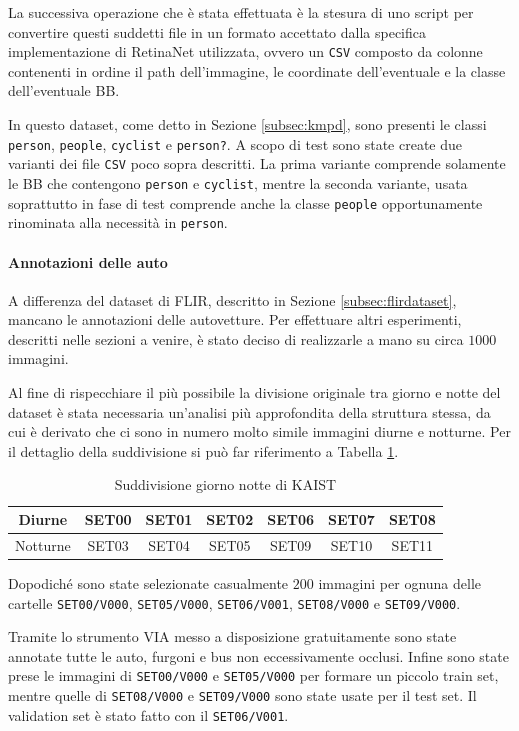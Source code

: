 La successiva operazione che è stata effettuata è la stesura di uno script per convertire questi suddetti file in un formato accettato dalla specifica implementazione di RetinaNet utilizzata, ovvero un \texttt{CSV} composto da colonne contenenti in ordine il path dell'immagine, le coordinate dell'eventuale e la classe dell'eventuale \ac{BB}. 

In questo dataset, come detto in Sezione \ref{subsec:kmpd}, sono presenti le classi \texttt{person}, \texttt{people}, \texttt{cyclist} e \texttt{person?}. A scopo di test sono state create due varianti dei file \texttt{CSV} poco sopra descritti. La prima variante comprende solamente le \ac{BB} che contengono \texttt{person} e \texttt{cyclist}, mentre la seconda variante, usata soprattutto in fase di test comprende anche la classe \texttt{people} opportunamente rinominata alla necessità in \texttt{person}.
\paragraph{Annotazioni delle auto}
A differenza del dataset di FLIR, descritto in Sezione \ref{subsec:flirdataset}, mancano le annotazioni delle autovetture. Per effettuare altri esperimenti, descritti nelle sezioni a venire, è stato deciso di realizzarle a mano su circa $1000$ immagini. 

Al fine di rispecchiare il più possibile la divisione originale tra giorno e notte del dataset è stata necessaria un'analisi più approfondita della struttura stessa, da cui è derivato che ci sono in numero molto simile immagini diurne e notturne. Per il dettaglio della suddivisione si può far riferimento a Tabella \ref{table:day_night_kaist}.
\begin{table}[]
    \begin{tabular}{c|cccccc}
    Diurne & SET00 & SET01 & SET02 & SET06 & SET07 & SET08 \\ \hline
    Notturne & SET03 & SET04 & SET05 & SET09 & SET10 & SET11
    \end{tabular}
    \caption{Suddivisione giorno notte di KAIST}
    \label{table:day_night_kaist}
\end{table}
Dopodiché sono state selezionate casualmente $200$ immagini per ognuna delle cartelle \texttt{SET00/V000}, \texttt{SET05/V000}, \texttt{SET06/V001}, \texttt{SET08/V000} e \texttt{SET09/V000}. 

Tramite lo strumento \ac{VIA} \cite{dutta2019vgg, dutta2016via} messo a disposizione gratuitamente sono state annotate tutte le auto, furgoni e bus non eccessivamente occlusi. Infine sono state prese le immagini di \texttt{SET00/V000} e \texttt{SET05/V000} per formare un piccolo train set, mentre quelle di \texttt{SET08/V000} e \texttt{SET09/V000} sono state usate per il test set. Il validation set è stato fatto con il \texttt{SET06/V001}. 

